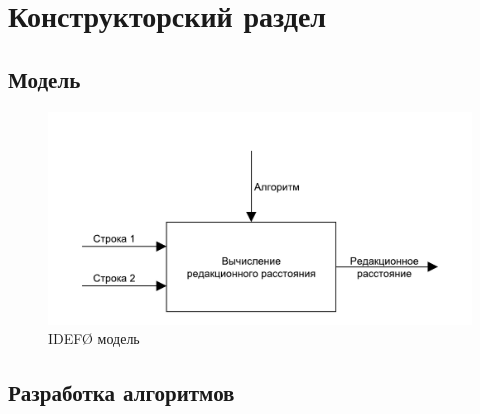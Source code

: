 \chapter{Конструкторский раздел}
\label{cha:design}

\section{Модель}
\begin{figure}
    \centering
    \includegraphics{pdf/mainIdef0.pdf}
    \caption{IDEF\O{} модель}
\end{figure}

\section{Разработка алгоритмов}

